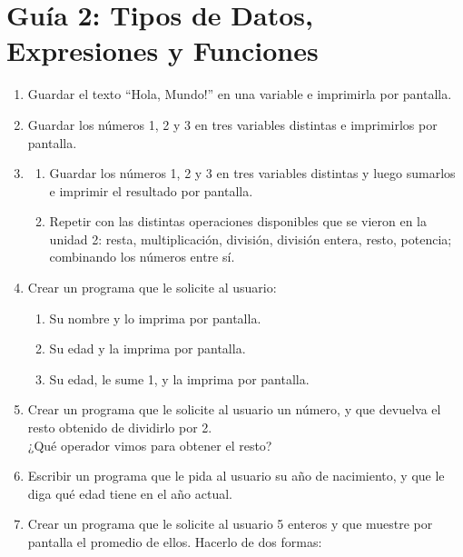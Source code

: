 \documentclass[
  letterpaper,
  DIV=11,
  numbers=noendperiod]{scrreprt}
\providecommand{\tightlist}{%
  \setlength{\itemsep}{0pt}\setlength{\parskip}{0pt}}\usepackage{longtable,booktabs,array}
\begin{document}
\hypertarget{guuxeda-2-tipos-de-datos-expresiones-y-funciones}{%
\section*{Guía 2: Tipos de Datos, Expresiones y
Funciones}\label{guuxeda-2-tipos-de-datos-expresiones-y-funciones}}


\begin{enumerate}
\def\labelenumi{\arabic{enumi}.}
\item
  Guardar el texto ``Hola, Mundo!'' en una variable e imprimirla por
  pantalla.
\item
  Guardar los números 1, 2 y 3 en tres variables distintas e imprimirlos
  por pantalla.
\item
  \begin{enumerate}
  \def\labelenumii{\alph{enumii}.}
  \tightlist
  \item
    Guardar los números 1, 2 y 3 en tres variables distintas y luego
    sumarlos e imprimir el resultado por pantalla.\\
  \item
    Repetir con las distintas operaciones disponibles que se vieron en
    la unidad 2: resta, multiplicación, división, división entera,
    resto, potencia; combinando los números entre sí.
  \end{enumerate}
\item
  Crear un programa que le solicite al usuario:

  \begin{enumerate}
  \def\labelenumii{\alph{enumii}.}
  \tightlist
  \item
    Su nombre y lo imprima por pantalla.
  \item
    Su edad y la imprima por pantalla.
  \item
    Su edad, le sume 1, y la imprima por pantalla.
  \end{enumerate}
\item
  Crear un programa que le solicite al usuario un número, y que devuelva
  el resto obtenido de dividirlo por 2.\\
  ¿Qué operador vimos para obtener el resto?
\item
  Escribir un programa que le pida al usuario su año de nacimiento, y
  que le diga qué edad tiene en el año actual.
\item
  Crear un programa que le solicite al usuario 5 enteros y que muestre
  por pantalla el promedio de ellos. Hacerlo de dos formas:


\end{enumerate}
\end{document}
